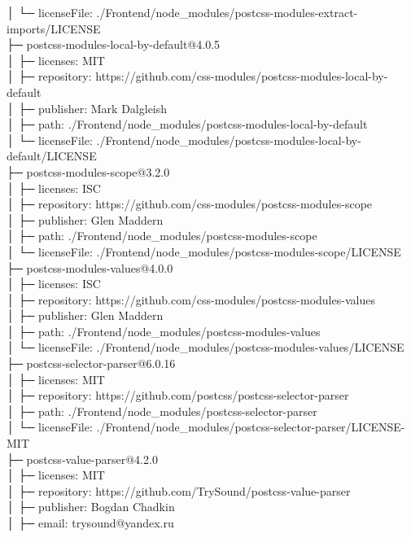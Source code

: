 │  └─ licenseFile: ./Frontend/node\_modules/postcss-modules-extract-imports/LICENSE\\
├─ postcss-modules-local-by-default@4.0.5\\
│  ├─ licenses: MIT\\
│  ├─ repository: https://github.com/css-modules/postcss-modules-local-by-default\\
│  ├─ publisher: Mark Dalgleish\\
│  ├─ path: ./Frontend/node\_modules/postcss-modules-local-by-default\\
│  └─ licenseFile: ./Frontend/node\_modules/postcss-modules-local-by-default/LICENSE\\
├─ postcss-modules-scope@3.2.0\\
│  ├─ licenses: ISC\\
│  ├─ repository: https://github.com/css-modules/postcss-modules-scope\\
│  ├─ publisher: Glen Maddern\\
│  ├─ path: ./Frontend/node\_modules/postcss-modules-scope\\
│  └─ licenseFile: ./Frontend/node\_modules/postcss-modules-scope/LICENSE\\
├─ postcss-modules-values@4.0.0\\
│  ├─ licenses: ISC\\
│  ├─ repository: https://github.com/css-modules/postcss-modules-values\\
│  ├─ publisher: Glen Maddern\\
│  ├─ path: ./Frontend/node\_modules/postcss-modules-values\\
│  └─ licenseFile: ./Frontend/node\_modules/postcss-modules-values/LICENSE\\
├─ postcss-selector-parser@6.0.16\\
│  ├─ licenses: MIT\\
│  ├─ repository: https://github.com/postcss/postcss-selector-parser\\
│  ├─ path: ./Frontend/node\_modules/postcss-selector-parser\\
│  └─ licenseFile: ./Frontend/node\_modules/postcss-selector-parser/LICENSE-MIT\\
├─ postcss-value-parser@4.2.0\\
│  ├─ licenses: MIT\\
│  ├─ repository: https://github.com/TrySound/postcss-value-parser\\
│  ├─ publisher: Bogdan Chadkin\\
│  ├─ email: trysound@yandex.ru\\
